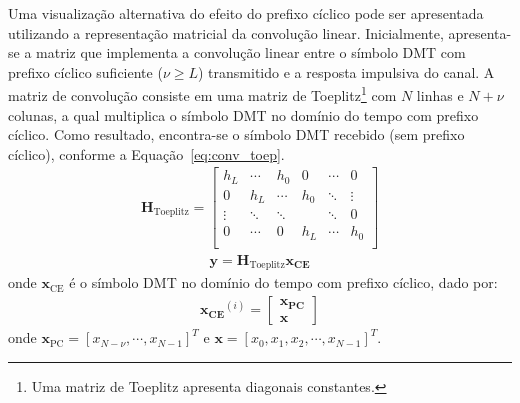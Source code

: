 Uma visualização alternativa do efeito do prefixo cíclico pode ser apresentada utilizando a representação matricial da convolução linear. Inicialmente, apresenta-se a matriz que implementa a convolução linear entre o símbolo DMT com prefixo cíclico suficiente ($\nu \geq L$) transmitido e a resposta impulsiva do canal. A matriz de convolução consiste em uma matriz de Toeplitz\footnote{Uma matriz de Toeplitz apresenta diagonais constantes.} com $N$ linhas e $N+\nu$ colunas, a qual multiplica o símbolo DMT no domínio do tempo com prefixo cíclico. Como resultado, encontra-se o símbolo DMT recebido (sem prefixo cíclico), conforme a Equação~\ref{eq:conv_toep}. 
\begin{align}
\mathbf{H}_\text{Toeplitz}=
\left[
\begin{array}{cccccccc}
h_L & \cdots & h_0 & 0 & \cdots & 0 \\
0 & h_L & \cdots & h_0 & \ddots & \vdots\\
\vdots & \ddots & \ddots &  & \ddots & 0\\
0 & \cdots & 0 & h_L & \cdots & h_0 \\
\end{array}
\right]
\label{eq:circ_h}
\end{align}
\begin{align}
\mathbf{y}= \mathbf{H}_\text{Toeplitz}\mathbf{x_\text{CE}}
\label{eq:conv_toep}
\end{align}
onde $\mathbf{x}_\text{CE}$ é o símbolo DMT no domínio do tempo com prefixo cíclico, dado por:
\begin{align}
\mathbf{x_\text{CE}}^{(i)} = 
\left[\begin{array}{c}
\mathbf{x_\text{PC}}\\
\mathbf{x}
\end{array}\right]
\label{eq:x_ce}
\end{align}
onde $\mathbf{x}_\text{PC} = \left[x_{N-\nu},  \cdots, x_{N-1}\right]^T$ e $\mathbf{x} = \left[x_0, x_1, x_2, \cdots, x_{N-1}\right]^T$.

